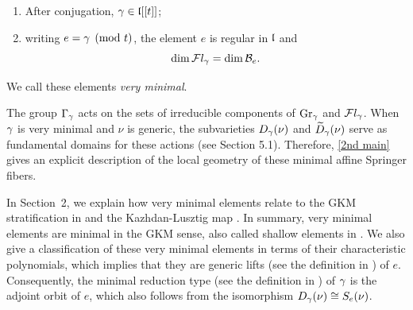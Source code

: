 \documentclass[11pt]{article}
\numberwithin{equation}{section}
\begin{document}
\begin{enumerate}
    \item After conjugation, $\gamma \in \mathfrak{l}[[t]]$;

    \item writing $e = \gamma \pmod{t}$, the element $e$ is regular in $\mathfrak{l}$ and
    \[
        \dim \mathcal{F}l_\gamma = \dim \mathcal{B}_e .
    \]
\end{enumerate}
\begin{defin}\label{def very minimal}
    We call these elements \textit{very minimal}. 
\end{defin}
The group $\Gamma_\gamma$ acts on the sets of irreducible components
of $\operatorname{Gr}_\gamma$ and $\mathcal{F}l_\gamma$. When $\gamma$ is very minimal and $\nu$ is generic, the
subvarieties $D_\gamma(\nu)$ and $\widetilde{D}_\gamma(\nu)$ serve as fundamental
domains for these actions (see Section 5.1). Therefore, \cref{2nd main} gives an
explicit description of the local geometry of these minimal affine Springer
fibers.

 In Section~2, we explain how very minimal elements relate to the GKM stratification in \cite{GKMstrat} and the Kazhdan-Lusztig map 
\cite{KL88}. In summary, very minimal elements are minimal in the GKM sense, also called shallow elements in \cite{Yun2021}. We also give a classification of these very minimal elements in terms of their characteristic polynomials, which implies that they are generic lifts (see the definition in \cite{KL88}) of $e$. Consequently, the minimal reduction type (see the definition in \cite{Yun2021}) of $\gamma$ is the adjoint orbit of $e$, which also follows from the isomorphism $D_\gamma(\nu)\cong S_e(\nu)$.
\end{document}
